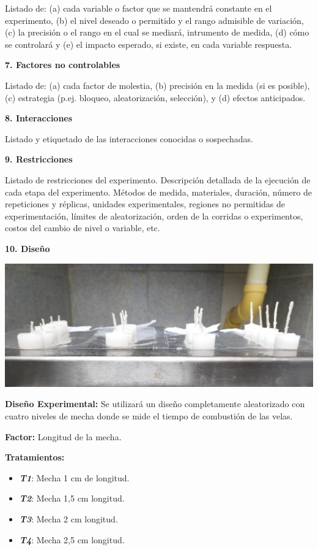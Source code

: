 \documentclass[
  letterpaper,
  DIV=11,
  numbers=noendperiod]{scrartcl}
\begin{document}
Listado de: (a) cada variable o factor que se mantendrá constante en el
experimento, (b) el nivel deseado o permitido y el rango admisible de
variación,(c) la precisión o el rango en el cual se mediará, intrumento
de medida, (d) cómo se controlará y (e) el impacto esperado, si existe,
en cada variable respuesta.

\textbf{7. Factores no controlables}

Listado de: (a) cada factor de molestia, (b) precisión en la medida (si
es posible), (c) estrategia (p.ej. bloqueo, aleatorización, selección),
y (d) efectos anticipados.

\textbf{8. Interacciones}

Listado y etiquetado de las interacciones conocidas o sospechadas.

\textbf{9. Restricciones}

Listado de restricciones del experimento. Descripción detallada de la
ejecución de cada etapa del experimento. Métodos de medida, materiales,
duración, número de repeticiones y réplicas, unidades experimentales,
regiones no permitidas de experimentación, límites de aleatorización,
orden de la corridas o experimentos, costos del cambio de nivel o
variable, etc.

\textbf{10. Diseño}

\includegraphics{imagenes/velas.jpeg}

\textbf{Diseño Experimental:} Se utilizará un diseño completamente
aleatorizado con cuatro niveles de mecha donde se mide el tiempo de
combustión de las velas.

\textbf{Factor:} Longitud de la mecha.

\textbf{Tratamientos:}

\begin{itemize}
\item
  \textbf{\emph{T1}}: Mecha 1 cm de longitud.
\item
  \textbf{\emph{T2}}: Mecha 1,5 cm longitud.
\item
  \textbf{\emph{T3}}: Mecha 2 cm longitud.
\item
  \textbf{\emph{T4}}: Mecha 2,5 cm longitud.
\end{itemize}
\end{document}
